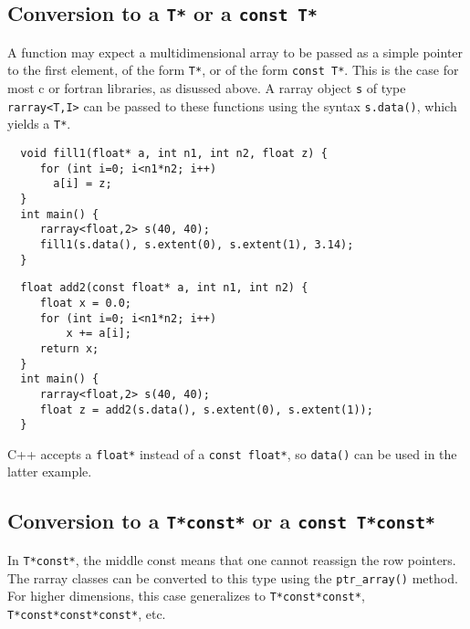 \documentclass[11pt,twoside]{article}
\begin{document}
\subsection{Conversion to a {\tt T*} or a {\tt const T*}}

A function may expect a multidimensional array to be passed as a
simple pointer to the first element, of the form \texttt{T*}, or of
the form  \texttt{const T*}. This is the case for most c or fortran
libraries, as disussed above. A rarray object
\texttt{s} of type \texttt{rarray{\tt<}T,I{\tt>}} can be passed to these
functions using the syntax \texttt{s.data()}, which yields a
\texttt{T*}.

\begin{framed}\vspace{-15pt}%
\begin{verbatim}
  void fill1(float* a, int n1, int n2, float z) {
     for (int i=0; i<n1*n2; i++)
       a[i] = z;
  }
  int main() {
     rarray<float,2> s(40, 40);
     fill1(s.data(), s.extent(0), s.extent(1), 3.14);
  }
\end{verbatim}%
\end{framed}

\pagebreak[3]

\vspace{-5pt}\begin{framed}\vspace{-14pt}%
\begin{verbatim}
  float add2(const float* a, int n1, int n2) {
     float x = 0.0;
     for (int i=0; i<n1*n2; i++)
         x += a[i];
     return x;
  }
  int main() {
     rarray<float,2> s(40, 40);
     float z = add2(s.data(), s.extent(0), s.extent(1));
  }
\end{verbatim}%
\vspace{-14pt}\end{framed}\vspace{-8pt}

\noindent
C++ accepts a \texttt{float*} instead of a \texttt{const float*}, so \texttt{data()} can be used in the latter example.

\subsection{Conversion to a {\tt T*const*} or a {\tt const T*const*} }

\noindent
In \texttt{T*const*}, the middle const means that one cannot reassign
the row pointers. 
The rarray classes can be converted to this type using the
\texttt{ptr\_array()} method.
For higher dimensions, this case generalizes to \texttt{T*const*const*}, \texttt{T*const*const*const*}, etc.
\end{document}
